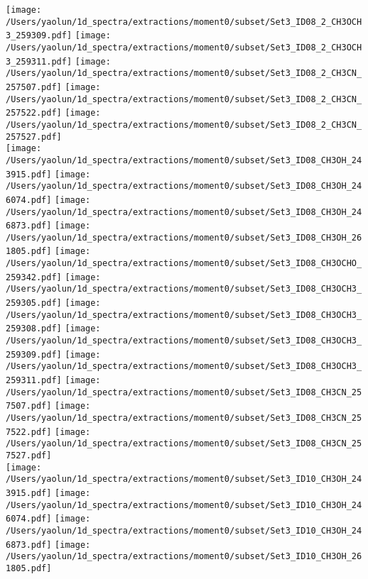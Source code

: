 \begin{figure*}[htbp!]
  \texttt{[image: /Users/yaolun/1d\_spectra/extractions/moment0/subset/Set3\_ID08\_2\_CH3OCH3\_259309.pdf]}
  \texttt{[image: /Users/yaolun/1d\_spectra/extractions/moment0/subset/Set3\_ID08\_2\_CH3OCH3\_259311.pdf]}
  \texttt{[image: /Users/yaolun/1d\_spectra/extractions/moment0/subset/Set3\_ID08\_2\_CH3CN\_257507.pdf]}
  \texttt{[image: /Users/yaolun/1d\_spectra/extractions/moment0/subset/Set3\_ID08\_2\_CH3CN\_257522.pdf]}
  \texttt{[image: /Users/yaolun/1d\_spectra/extractions/moment0/subset/Set3\_ID08\_2\_CH3CN\_257527.pdf]}
  \\
  \texttt{[image: /Users/yaolun/1d\_spectra/extractions/moment0/subset/Set3\_ID08\_CH3OH\_243915.pdf]}
  \texttt{[image: /Users/yaolun/1d\_spectra/extractions/moment0/subset/Set3\_ID08\_CH3OH\_246074.pdf]}
  \texttt{[image: /Users/yaolun/1d\_spectra/extractions/moment0/subset/Set3\_ID08\_CH3OH\_246873.pdf]}
  \texttt{[image: /Users/yaolun/1d\_spectra/extractions/moment0/subset/Set3\_ID08\_CH3OH\_261805.pdf]}
  \texttt{[image: /Users/yaolun/1d\_spectra/extractions/moment0/subset/Set3\_ID08\_CH3OCHO\_259342.pdf]}
  \texttt{[image: /Users/yaolun/1d\_spectra/extractions/moment0/subset/Set3\_ID08\_CH3OCH3\_259305.pdf]}
  \texttt{[image: /Users/yaolun/1d\_spectra/extractions/moment0/subset/Set3\_ID08\_CH3OCH3\_259308.pdf]}
  \texttt{[image: /Users/yaolun/1d\_spectra/extractions/moment0/subset/Set3\_ID08\_CH3OCH3\_259309.pdf]}
  \texttt{[image: /Users/yaolun/1d\_spectra/extractions/moment0/subset/Set3\_ID08\_CH3OCH3\_259311.pdf]}
  \texttt{[image: /Users/yaolun/1d\_spectra/extractions/moment0/subset/Set3\_ID08\_CH3CN\_257507.pdf]}
  \texttt{[image: /Users/yaolun/1d\_spectra/extractions/moment0/subset/Set3\_ID08\_CH3CN\_257522.pdf]}
  \texttt{[image: /Users/yaolun/1d\_spectra/extractions/moment0/subset/Set3\_ID08\_CH3CN\_257527.pdf]}
  \\
  \texttt{[image: /Users/yaolun/1d\_spectra/extractions/moment0/subset/Set3\_ID10\_CH3OH\_243915.pdf]}
  \texttt{[image: /Users/yaolun/1d\_spectra/extractions/moment0/subset/Set3\_ID10\_CH3OH\_246074.pdf]}
  \texttt{[image: /Users/yaolun/1d\_spectra/extractions/moment0/subset/Set3\_ID10\_CH3OH\_246873.pdf]}
  \texttt{[image: /Users/yaolun/1d\_spectra/extractions/moment0/subset/Set3\_ID10\_CH3OH\_261805.pdf]}

\end{figure*}
